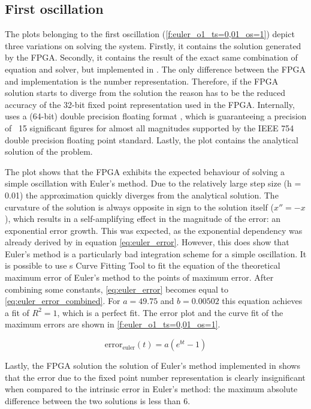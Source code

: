 \subsection{First oscillation}
The plots belonging to the first oscillation (\ref{f:euler_o1_ts=0,01_os=1}) depict three variations on solving the system. Firstly, it contains the solution generated by the FPGA. Secondly, it contains the result of the exact same combination of equation and solver, but implemented in \matlab{}. The only difference between the FPGA and \matlab{} implementation is the number representation. Therefore, if the FPGA solution starts to diverge from the \matlab{} solution the reason has to be the reduced accuracy of the 32-bit fixed point representation used in the FPGA. Internally, \matlab{} uses a (64-bit) double precision floating format \cite{MatlabFloat}, which is guaranteeing a precision of ~15 significant figures for almost all magnitudes supported by the IEEE 754 double precision floating point standard. Lastly, the plot contains the analytical solution of the problem.

The plot shows that the FPGA exhibits the expected behaviour of solving a simple oscillation with Euler's method. Due to the relatively large step size (h = 0.01) the approximation quickly diverges from the analytical solution. The curvature of the solution is always opposite in sign to the solution itself ($x'' = -x$), which results in a self-amplifying effect in the magnitude of the error: an exponential error growth. This was expected, as the exponential dependency was already derived by \cite{DE} in equation \ref{eq:euler_error}. However, this does show that Euler's method is a particularly bad integration scheme for a simple oscillation. It is possible to use \matlab{}s Curve Fitting Tool to fit the equation of the theoretical maximum error of Euler's method to the points of maximum error. After combining some constants, \ref{eq:euler_error} becomes equal to \ref{eq:euler_error_combined}. For $a = 49.75$ and $b = 0.00502$ this equation achieves a fit of $R^{2} = 1$, which is a perfect fit. The error plot and the curve fit of the maximum errors are shown in \ref{f:euler_o1_ts=0,01_os=1}.

\begin{equation}
\label{eq:euler_error_combined}
\text{error}_{\text{euler}}(t) = a (e^{b t} - 1)
\end{equation}

Lastly, the FPGA solution the solution of Euler's method implemented in \matlab{} shows that the error due to the fixed point number representation is clearly insignificant when compared to the intrinsic error in Euler's method: the maximum absolute difference between the two solutions is less than 6.

